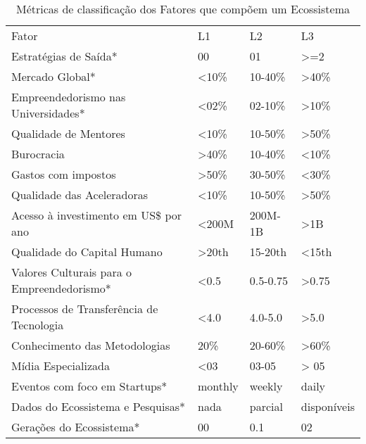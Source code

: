 \begin{table}[!htb]
\centering
\caption{Métricas de classificação dos Fatores que compõem um Ecossistema}
\label{tabela:metricas_de_classificacao_dos_fatores}
\begin{tabular}{llll}
Fator                                                      &     L1     &     L2     &     L3   \\
Estratégias de Saída*                                      &     00     &     01     &    >=2   \\
Mercado Global*                                            &    <10\%   &   10-40\%  &    >40\% \\
Empreendedorismo nas Universidades*                        &    <02\%   &   02-10\%  &    >10\% \\
Qualidade de Mentores                                      &    <10\%   &   10-50\%  &    >50\% \\
Burocracia                                                 &    >40\%   &   10-40\%  &    <10\% \\
Gastos com impostos                                        &    >50\%   &   30-50\%  &    <30\% \\
Qualidade das Aceleradoras                                 &    <10\%   &   10-50\%  &    >50\% \\
Acesso à investimento em US\$ por ano                      &    <200M   &   200M-1B  &    >1B   \\
Qualidade do Capital Humano                                &    >20th   &   15-20th  &    <15th \\
Valores Culturais para o Empreendedorismo*                 &    <0.5    &   0.5-0.75 &    >0.75 \\
Processos de Transferência de Tecnologia                   &    <4.0    &   4.0-5.0  &    >5.0  \\
Conhecimento das Metodologias                              &    20\%    &   20-60\%  &    >60\% \\
Mídia Especializada                                        &    <03     &   03-05    &    > 05  \\
Eventos com foco em Startups*                              &   monthly  &   weekly   &    daily \\
Dados do Ecossistema e Pesquisas*                          &    nada    & parcial &disponíveis  \\
Gerações do Ecossistema*                                   &     00     &    0.1     &    02    \\

\end{tabular}
\end{table}
